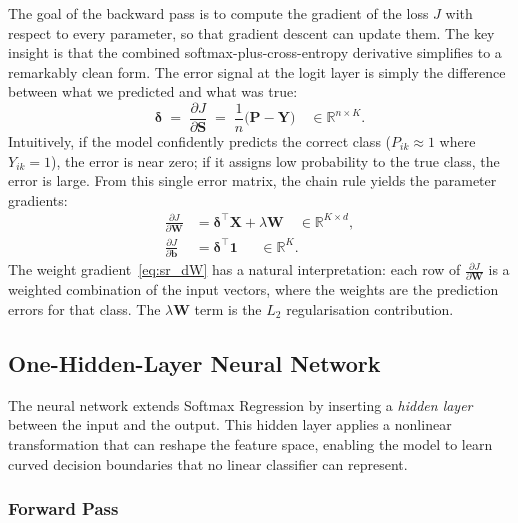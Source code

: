 \documentclass[11pt]{article}
\newcommand{\R}{\mathbb{R}}
\newcommand{\bX}{\mathbf{X}}
\newcommand{\bW}{\mathbf{W}}
\newcommand{\bb}{\mathbf{b}}
\newcommand{\bY}{\mathbf{Y}}
\newcommand{\bP}{\mathbf{P}}
\newcommand{\bS}{\mathbf{S}}
\newcommand{\bone}{\mathbf{1}}
\newcommand{\bdelta}{\boldsymbol{\delta}}
\begin{document}
The goal of the backward pass is to compute the gradient of the loss $J$ with respect to every parameter, so that gradient descent can update them. The key insight is that the combined softmax-plus-cross-entropy derivative simplifies to a remarkably clean form. The error signal at the logit layer is simply the difference between what we predicted and what was true:
\begin{equation}\label{eq:sr_delta}
  \bdelta \;=\; \frac{\partial J}{\partial \bS}
  \;=\; \frac{1}{n}\bigl(\bP - \bY\bigr) \quad \in \R^{n \times K}.
\end{equation}
Intuitively, if the model confidently predicts the correct class ($P_{ik} \approx 1$ where $Y_{ik} = 1$), the error is near zero; if it assigns low probability to the true class, the error is large. From this single error matrix, the chain rule yields the parameter gradients:
\begin{align}
  \frac{\partial J}{\partial \bW} &= \bdelta^\top \bX + \lambda\bW \quad \in \R^{K \times d}, \label{eq:sr_dW}\\[4pt]
  \frac{\partial J}{\partial \bb} &= \bdelta^\top \bone \quad\;\;\in \R^{K}. \label{eq:sr_db}
\end{align}
The weight gradient~\eqref{eq:sr_dW} has a natural interpretation: each row of $\frac{\partial J}{\partial \bW}$ is a weighted combination of the input vectors, where the weights are the prediction errors for that class. The $\lambda\bW$ term is the $L_2$ regularisation contribution.

\subsection{One-Hidden-Layer Neural Network}
\label{sec:nn}

The neural network extends Softmax Regression by inserting a \emph{hidden layer} between the input and the output. This hidden layer applies a nonlinear transformation that can reshape the feature space, enabling the model to learn curved decision boundaries that no linear classifier can represent.

\subsubsection*{Forward Pass}
\end{document}
